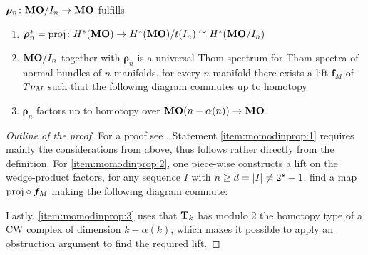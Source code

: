 \begin{Thm*}
  $\bm{\rho}_n\colon\bm{\mathrm{MO}}/I_{n}\to\bm{\mathrm{MO}}$ fulfills 
  \begin{enumerate}
  \item\label{item:momodinprop:1}
    ${\bm{\rho}}^*_n=\mathrm{proj}\colon
    H^*(\bm{\mathrm{MO}})
    \to H^*(\bm{\mathrm{MO}})/t(I_{n})\cong H^*(\bm{\mathrm{MO}}/I_{n})$
  \item\label{item:momodinprop:2}
    $\bm{\mathrm{MO}}/I_{n}$ together with $\bm{\rho}_n$ is a universal Thom spectrum
    for Thom spectra of normal bundles of $n$-manifolds.
    \Idest for every $n$-manifold there exists a lift $\bm{f}_M$ of
    $T{\nu_{M}}$ 
    such that the following diagram commutes up to homotopy
    \begin{center}
    \end{center}
  \item\label{item:momodinprop:3}
    $\bm{\rho}_n$ factors up to homotopy over
    $\bm{\mathrm{MO}}(n-\alpha(n))\to\bm{\mathrm{MO}}$.
  \end{enumerate}
  \begin{proof}[Outline of the proof]
    For a proof see \cite[Lemma~2.28, Theorem~2.29]{immersionconj}.
    Statement \ref{item:momodinprop:1} requires mainly the
    considerations from above, thus follows rather directly from the
    definition.
    For \ref{item:momodinprop:2}, one piece-wise constructs a lift on
    the wedge-product factors, \idest for any
    sequence $I$ with $n\geq d=\left|I\right|\neq2^s-1$, find a map
    $\mathrm{proj}\circ\bm{f}_M$ making the following diagram commute:
    \begin{center}
    \end{center}
    Lastly, \ref{item:momodinprop:3} uses that $\bm{\mathrm{T}}{}_{k}$ has
    modulo 2 the homotopy type of a CW complex of dimension $k-\alpha(k)$,
    which makes it possible to apply an obstruction argument to find
    the required lift.
  \end{proof}
\end{Thm*}

